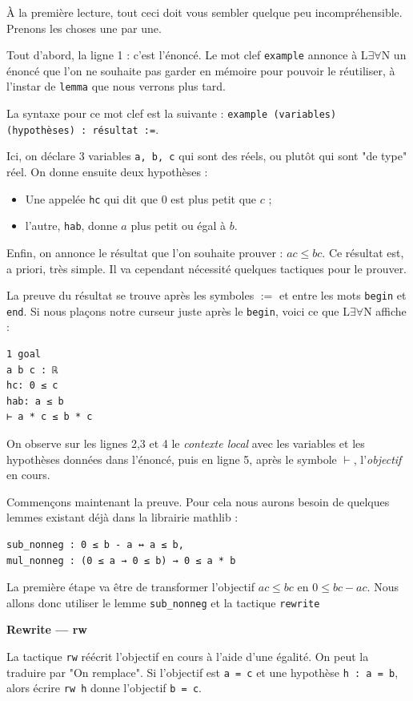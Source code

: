 \documentclass[a4paper, 11pt, twoside]{report}
\newcommand{\LEAN}{L$\exists\forall$N }
\begin{document}
À la première lecture, tout ceci doit vous sembler quelque peu incompréhensible. Prenons les choses une par une.

Tout d'abord, la ligne 1 : c'est l'énoncé. Le mot clef \verb|example| annonce à \LEAN un énoncé que l'on ne souhaite pas garder en mémoire pour pouvoir le réutiliser, à l'instar de \verb|lemma| que nous verrons plus tard. 

La syntaxe pour ce mot clef est la suivante : \verb|example (variables) (hypothèses) : résultat :=|. 

Ici, on déclare 3 variables \verb|a, b, c| qui sont des réels, ou plutôt qui sont "de type" réel. On donne ensuite deux hypothèses :
\begin{itemize}
	\item Une appelée \verb|hc| qui dit que $0$ est plus petit que $c$ ;
	\item l'autre, \verb|hab|, donne $a$ plus petit ou égal à $b$.
\end{itemize}
Enfin, on annonce le résultat que l'on souhaite prouver : $ac\leq bc$. Ce résultat est, a priori, très simple. Il va cependant nécessité quelques tactiques pour le prouver.

La preuve du résultat se trouve après les symboles $:=$ et entre les mots \verb|begin| et \verb|end|. Si nous plaçons notre curseur juste après le \verb|begin|, voici ce que \LEAN affiche :

\begin{lstlisting}
1 goal
a b c : ℝ
hc: 0 ≤ c
hab: a ≤ b
⊢ a * c ≤ b * c
\end{lstlisting}


On observe sur les lignes 2,3 et 4 le \textit{contexte local} avec les variables et les hypothèses données dans l'énoncé, puis en ligne 5, après le symbole $\vdash$, l'\textit{objectif} en cours.

Commençons maintenant la preuve. Pour cela nous aurons besoin de quelques lemmes existant déjà dans la librairie mathlib : 

\begin{lstlisting}
sub_nonneg : 0 ≤ b - a ↔ a ≤ b,
mul_nonneg : (0 ≤ a → 0 ≤ b) → 0 ≤ a * b 
\end{lstlisting}

La première étape va être de transformer l'objectif $ac\leq bc$ en $0 \leq bc - ac$. Nous allons donc utiliser le lemme \verb|sub_nonneg| et la tactique \verb|rewrite|

\begin{tactic}
	\centerline{\bfseries Rewrite --- rw}
	La tactique \verb|rw| réécrit l'objectif en cours à l'aide d'une égalité. On peut la traduire par "On remplace". 
	\tcblower
	Si l'objectif est \verb|a = c| et une hypothèse \verb|h : a = b|, alors écrire \verb|rw h| donne l'objectif \verb|b = c|.
\end{tactic}
\end{document}
